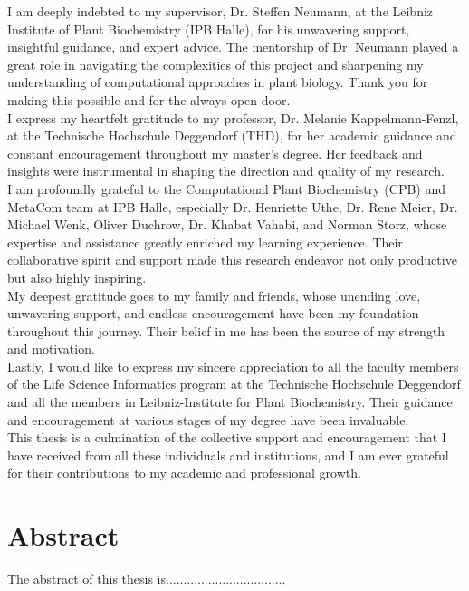 \documentclass[12pt,a4paper]{report}
\begin{document}
I am deeply indebted to my supervisor, Dr. Steffen Neumann, at the Leibniz Institute of Plant Biochemistry (IPB Halle), for his unwavering support, insightful guidance, and expert advice. The mentorship of Dr. Neumann played a great role in navigating the complexities of this project and sharpening my understanding of computational approaches in plant biology. Thank you for making this possible and for the always open door. \\

I express my heartfelt gratitude to my professor, Dr. Melanie Kappelmann-Fenzl, at the Technische Hochschule Deggendorf (THD), for her academic guidance and constant encouragement throughout my master’s degree. Her feedback and insights were instrumental in shaping the direction and quality of my research. \\

I am profoundly grateful to the Computational Plant Biochemistry (CPB) and MetaCom team at IPB Halle, especially Dr. Henriette Uthe, Dr. Rene Meier, Dr. Michael Wenk, Oliver Duchrow, Dr. Khabat Vahabi, and Norman Storz, whose expertise and assistance greatly enriched my learning experience. Their collaborative spirit and support made this research endeavor not only productive but also highly inspiring. \\

My deepest gratitude goes to my family and friends, whose unending love, unwavering support, and endless encouragement have been my foundation throughout this journey. Their belief in me has been the source of my strength and motivation. \\

Lastly, I would like to express my sincere appreciation to all the faculty members of the Life Science Informatics program at the Technische Hochschule Deggendorf and all the members in Leibniz-Institute for Plant Biochemistry. Their guidance and encouragement at various stages of my degree have been invaluable. \\

This thesis is a culmination of the collective support and encouragement that I have received from all these individuals and institutions, and I am ever grateful for their contributions to my academic and professional growth. \\

\newpage
\section*{Abstract}
The abstract of this thesis is..................................
\end{document}
